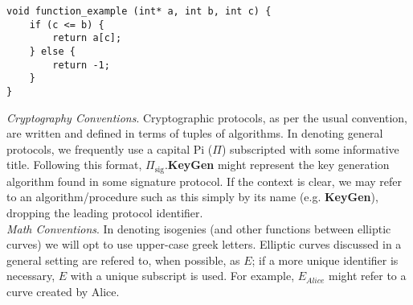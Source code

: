\label{code:pbinv}
\begin{lstlisting}
void function_example (int* a, int b, int c) {
	if (c <= b) {
		return a[c];
	} else {
		return -1;
	}
}
\end{lstlisting}

\noindent
\textit{Cryptography Conventions}. Cryptographic protocols, as per the usual convention, are written and defined in terms of tuples of algorithms. In denoting general protocols, we frequently use a capital Pi ($\Pi$) subscripted with some informative title. Following this format, $\Pi_{\text{sig}}$.\textbf{KeyGen} might represent the key generation algorithm found in some signature protocol. If the context is clear, we may refer to an algorithm/procedure such as this simply by its name (e.g. \textbf{KeyGen}), dropping the leading protocol identifier.\\

\noindent
\textit{Math Conventions}. In denoting isogenies (and other functions between elliptic curves) we will opt to use upper-case greek letters. Elliptic curves discussed in a general setting are refered to, when possible, as $E$; if a more unique identifier is necessary, $E$ with a unique subscript is used. For example, $E_{Alice}$ might refer to a curve created by Alice.  


